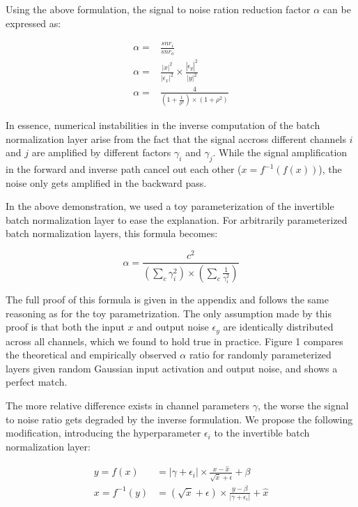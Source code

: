 \documentclass[twocolumn]{bmcart}
\begin{document}
Using the above formulation, the signal to noise ration reduction factor $\alpha$ can be expressed as:

\begin{subequations}
\begin{align}
\alpha =& \frac{snr_i}{snr_o} \\
\alpha =& \frac{|x|^2}{|\epsilon_x|^2} \times  \frac{|\epsilon_y|^2}{|y|^2} \\
\alpha =& \frac{4}{(1+\frac{1}{\rho^2}) \times (1 + \rho^2)}
\end{align}
\end{subequations}

In essence, numerical instabilities in the inverse computation of the batch normalization layer arise from the fact that the signal accross different channels $i$ and $j$ are amplified by different factors $\gamma_i$ and $\gamma_j$. While the signal amplification in the forward and inverse path cancel out each other ($x=f^{-1}(f(x))$), the noise only gets amplified in the backward pass.

In the above demonstration, we used a toy parameterization of the invertible batch normalization layer to ease the explanation. 
For arbitrarily parameterized batch normalization layers, this formula becomes:

\begin{equation}
\alpha = \frac{c^2}{(\sum_{c} \gamma_i^2) \times (\sum_{c} \frac{1}{\gamma_i^2})}
\end{equation}

The full proof of this formula is given in the appendix and follows the same reasoning as for the toy parametrization. The only assumption made by this proof is that both the input $x$ and output noise $\epsilon_y$ are identically distributed across all channels, which we found to hold true in practice. Figure 1 compares the theoretical and empirically observed  $\alpha$ ratio for randomly parameterized layers given random Gaussian input activation and output noise, and shows a perfect match.

The more relative difference exists in channel parameters $\gamma$, the worse the signal to noise ratio gets degraded by the inverse formulation.
We propose the following modification, introducing the hyperparameter $\epsilon_i$  to the invertible batch normalization layer:

\begin{subequations}
\begin{align}
y = f(x) &= |\gamma + \epsilon_i| \times \frac{x - \hat{x}}{\sqrt{\dot{x}} + \epsilon} + \beta \\
x = f^{-1}(y) &= (\sqrt{\dot{x}} + \epsilon) \times \frac{y -  \beta}{|\gamma + \epsilon_i|}  + \hat{x}
\end{align}
\end{subequations}
\end{document}
